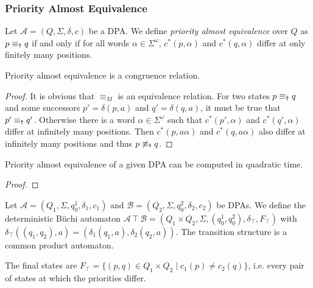 \subsubsection{Priority Almost Equivalence}

\begin{defn}
	Let $\mathcal{A} = (Q, \Sigma, \delta, c)$ be a DPA. We define \emph{priority almost equivalence} over $Q$ as $p \equiv_\text{\Ankh} q$ if and only if for all words $\alpha \in \Sigma^\omega$, $c^*(p, \alpha)$ and $c^*(q, \alpha)$ differ at only finitely many positions.
\end{defn}

\begin{lem}
	Priority almost equivalence is a congruence relation.
\end{lem}

\begin{proof}
	It is obvious that $\equiv_M$ is an equivalence relation. For two states $p \equiv_\text{\Ankh} q$ and some successors $p' = \delta(p, a)$ and $q' = \delta(q, a)$, it must be true that $p' \equiv_\text{\Ankh} q'$. Otherwise there is a word $\alpha \in \Sigma^\omega$ such that $c^*(p', \alpha)$ and $c^*(q', \alpha)$ differ at infinitely many positions. Then $c^*(p, a \alpha)$ and $c^*(q, a \alpha)$ also differ at infinitely many positions and thus $p \not\equiv_\text{\Ankh} q$.
\end{proof}

\begin{lem}
	Priority almost equivalence of a given DPA can be computed in quadratic time.
\end{lem}

\begin{proof}
\end{proof}


\begin{defn}
	Let $\mathcal{A} = (Q_1, \Sigma, q^1_0, \delta_1, c_1)$ and $\mathcal{B} = (Q_2, \Sigma, q^2_0, \delta_2, c_2)$ be DPAs. We define the deterministic Büchi automaton $\mathcal{A} \intercal \mathcal{B} = (Q_1 \times Q_2, \Sigma, (q^1_0, q^2_0), \delta_\intercal, F_\intercal)$ with $\delta_\intercal((q_1, q_2), a) = (\delta_1(q_1, a), \delta_2(q_2, a))$. The transition structure is a common product automaton.
	
	The final states are $F_\intercal = \{ (p, q) \in Q_1 \times Q_2 \mid c_1(p) \neq c_2(q) \}$, i.e. every pair of states at which the priorities differ. 
\end{defn}

